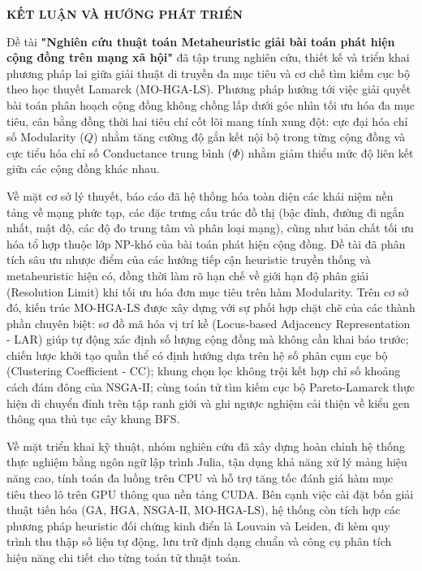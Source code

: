 \documentclass[14pt,a4paper]{extarticle}
\begin{document}
\newpage
\begin{center}
\textbf{\fontsize{20}{24}\selectfont
KẾT LUẬN VÀ HƯỚNG PHÁT TRIỂN}
\end{center}

Đề tài \textbf{"Nghiên cứu thuật toán Metaheuristic giải bài toán phát hiện cộng đồng trên mạng xã hội"} đã tập trung nghiên cứu, thiết kế và triển khai phương pháp lai giữa giải thuật di truyền đa mục tiêu và cơ chế tìm kiếm cục bộ theo học thuyết Lamarck ($\text{MO-HGA-LS}$). Phương pháp hướng tới việc giải quyết bài toán phân hoạch cộng đồng không chồng lấp dưới góc nhìn tối ưu hóa đa mục tiêu, cân bằng đồng thời hai tiêu chí cốt lõi mang tính xung đột: cực đại hóa chỉ số Modularity ($Q$) nhằm tăng cường độ gắn kết nội bộ trong từng cộng đồng và cực tiểu hóa chỉ số Conductance trung bình ($\Phi$) nhằm giảm thiểu mức độ liên kết giữa các cộng đồng khác nhau.

Về mặt cơ sở lý thuyết, báo cáo đã hệ thống hóa toàn diện các khái niệm nền tảng về mạng phức tạp, các đặc trưng cấu trúc đồ thị (bậc đỉnh, đường đi ngắn nhất, mật độ, các độ đo trung tâm và phân loại mạng), cũng như bản chất tối ưu hóa tổ hợp thuộc lớp NP-khó của bài toán phát hiện cộng đồng. Đề tài đã phân tích sâu ưu nhược điểm của các hướng tiếp cận heuristic truyền thống và metaheuristic hiện có, đồng thời làm rõ hạn chế về giới hạn độ phân giải (Resolution Limit) khi tối ưu hóa đơn mục tiêu trên hàm Modularity. Trên cơ sở đó, kiến trúc $\text{MO-HGA-LS}$ được xây dựng với sự phối hợp chặt chẽ của các thành phần chuyên biệt: sơ đồ mã hóa vị trí kề (Locus-based Adjacency Representation - LAR) giúp tự động xác định số lượng cộng đồng mà không cần khai báo trước; chiến lược khởi tạo quần thể có định hướng dựa trên hệ số phân cụm cục bộ (Clustering Coefficient - CC); khung chọn lọc không trội kết hợp chỉ số khoảng cách đám đông của $\text{NSGA-II}$; cùng toán tử tìm kiếm cục bộ Pareto-Lamarck thực hiện di chuyển đỉnh trên tập ranh giới và ghi ngược nghiệm cải thiện về kiểu gen thông qua thủ tục cây khung BFS.

Về mặt triển khai kỹ thuật, nhóm nghiên cứu đã xây dựng hoàn chỉnh hệ thống thực nghiệm bằng ngôn ngữ lập trình Julia, tận dụng khả năng xử lý mảng hiệu năng cao, tính toán đa luồng trên CPU và hỗ trợ tăng tốc đánh giá hàm mục tiêu theo lô trên GPU thông qua nền tảng CUDA. Bên cạnh việc cài đặt bốn giải thuật tiến hóa ($\text{GA}$, $\text{HGA}$, $\text{NSGA-II}$, $\text{MO-HGA-LS}$), hệ thống còn tích hợp các phương pháp heuristic đối chứng kinh điển là Louvain và Leiden, đi kèm quy trình thu thập số liệu tự động, lưu trữ định dạng chuẩn và công cụ phân tích hiệu năng chi tiết cho từng toán tử thuật toán.
\end{document}
